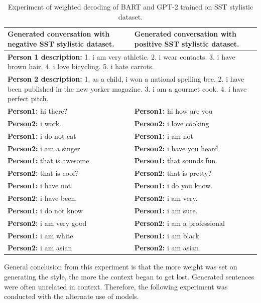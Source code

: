 \begin{table}[H]
\centering
 \begin{tabular}{|p{7cm}|p{7cm}|} 
 \hline
 \textbf{Generated conversation with negative SST stylistic dataset.} & \textbf{Generated conversation with positive SST stylistic dataset.}\\
 \hline
 \multicolumn{2}{|p{14cm}|}{\textbf{Person 1 description:} 1. i am very athletic. 2. i wear contacts. 3. i have brown hair. 4. i love bicycling. 5. i hate carrots.} \\
 \hline
 \multicolumn{2}{|p{14cm}|}{\textbf{Person 2 description:} 1. as a child, i won a national spelling bee. 2. i have been published in the new yorker magazine. 3. i am a gourmet cook. 4. i have perfect pitch.} \\
 \hline
 \textbf{Person1:} hi there? & \textbf{Person1:} hi how are you \\
 \textbf{Person2:} i work. &  \textbf{Person2:} i love cooking \\ 
 \textbf{Person1:} i do not eat & \textbf{Person1:} i am not \\
 \textbf{Person2:} i am a singer & \textbf{Person2:} i have you heard \\
 \textbf{Person1:} that is awesome & \textbf{Person1:} that sounds fun. \\
 \textbf{Person2:} that is cool? & \textbf{Person2:} that is pretty?  \\
 \textbf{Person1:} i have not. & \textbf{Person1:} i do you know. \\
 \textbf{Person2:} i have been. & \textbf{Person2:} i am very. \\
 \textbf{Person1:} i do not know & \textbf{Person1:} i am sure. \\
 \textbf{Person2:} i am very good & \textbf{Person2:} i am a professional \\
 \textbf{Person1:} i am white & \textbf{Person1:} i am black \\
 \textbf{Person2:} i am asian & \textbf{Person2:} i am asian \\
 \hline
 \end{tabular}
 \caption{Experiment of weighted decoding of BART and GPT-2 trained on SST stylistic dataset.}
\label{tab:sst_wd}
\end{table}

General conclusion from this experiment is that the more weight was set on generating the style, the more the context began to get lost. Generated sentences were often unrelated in context. Therefore, the following experiment was conducted with the alternate use of models.

